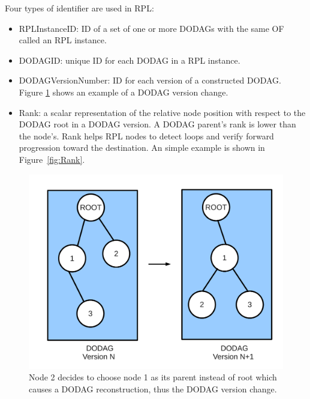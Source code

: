 Four types of identifier are used in RPL:
\begin{itemize}
\item RPLInstanceID: ID of a set of one or more DODAGs with the same OF called an RPL instance.
\newline

\item DODAGID: unique ID for each DODAG in a RPL instance.
\newline

\item DODAGVersionNumber: ID for each version of a constructed DODAG. Figure \ref{fig:DODAGVersion} shows an example of a DODAG version change.
\newline

\item Rank: a scalar representation of the relative node position with respect to the DODAG root in a DODAG version. A DODAG parent's rank is lower than the node's. Rank helps RPL nodes to detect loops and verify forward progression toward the destination. An simple example is shown in Figure~\ref{fig:Rank}.
\end{itemize}

\begin{figure}[htbp]
  \begin{center}
    \leavevmode
      \includegraphics[scale=0.3]{Pics/DODAGVersion.pdf}
    \caption{Node 2 decides to choose node 1 as its parent instead of root which causes a DODAG reconstruction, thus the DODAG version change.}
    \label{fig:DODAGVersion}
  \end{center}
\end{figure}

